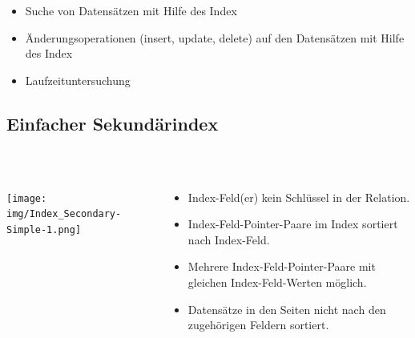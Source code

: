 \begin{frame}{\insertsection}
\framesubtitle{\insertsubsection}
\\[4pt]
\begin{itemize}
	\item Suche von Datens\"atzen mit Hilfe des Index
	\item \"Anderungsoperationen (insert, update, delete) auf den Datens\"atzen mit Hilfe des Index
	\item Laufzeituntersuchung
\end{itemize}
\end{frame}

\subsection{Einfacher Sekund\"arindex}

\begin{frame}{\insertsection}
\framesubtitle{\insertsubsection}
\\[4pt]
\begin{columns}[T]
	\begin{column}{.33\textwidth}
		\texttt{[image: img/Index\_Secondary-Simple-1.png]}
	\end{column}
	\begin{column}{.67\textwidth}
		\begin{itemize}
			\item Index-Feld(er) kein Schl\"ussel in der Relation.
			\item Index-Feld-Pointer-Paare im Index sortiert nach Index-Feld.
			\item Mehrere Index-Feld-Pointer-Paare mit gleichen Index-Feld-Werten m\"oglich.
			\item Datens\"atze in den Seiten nicht nach den zugeh\"origen Feldern sortiert.
		\end{itemize}
	\end{column}
\end{columns}
\end{frame}


